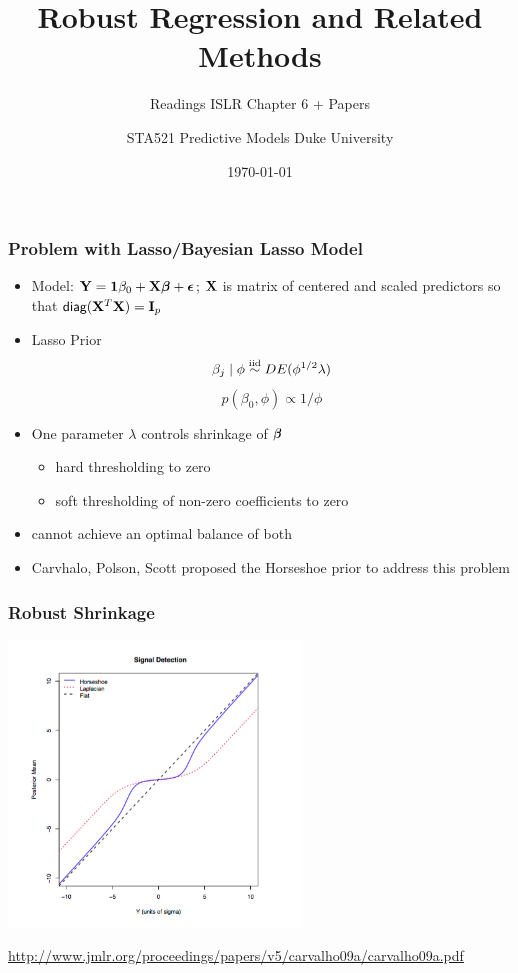 \documentclass{beamer}\usepackage[]{graphicx}\usepackage[]{color}
\title{Robust Regression and Related Methods}
\subtitle{Readings ISLR Chapter 6 + Papers}
\institute{Merlise Clyde}
\author{STA521 Predictive Models Duke University}
\date{\today}
\begin{document}
\maketitle

\begin{frame} \frametitle{Problem with Lasso/Bayesian Lasso Model}

\begin{itemize}
\item Model: $\mathbf{Y} = \mathbf{1} \beta_0 + \mathbf{X} \boldsymbol{\beta} + \boldsymbol{\epsilon}$;  $\mathbf{X}$ is matrix of centered and scaled predictors so that  $\textsf{diag}(\mathbf{X}^T\mathbf{X}) = \mathbf{I}_p$ \pause
\item Lasso Prior
    $$\beta_j \mid \phi \mathrel{\mathop{\sim}\limits^{\rm iid}} DE(\phi^{1/2} \lambda)$$   \pause
    $$p(\beta_0, \phi) \propto 1/\phi $$ \pause
\item One parameter $\lambda$ controls shrinkage of $\boldsymbol{\beta}$  \pause
 \begin{itemize}
 \item hard thresholding to zero  \pause
 \item soft thresholding of non-zero coefficients to zero  \pause
 \end{itemize}
\item cannot achieve an optimal balance of both  \pause
\item Carvhalo, Polson, Scott proposed the Horseshoe prior to address this problem  \pause
\end{itemize}
\end{frame}

\begin{frame}\frametitle{Robust Shrinkage}

\includegraphics[height=3.0in]{shrinkage.jpg}

\url{http://www.jmlr.org/proceedings/papers/v5/carvalho09a/carvalho09a.pdf}
\end{frame}
\end{document}

